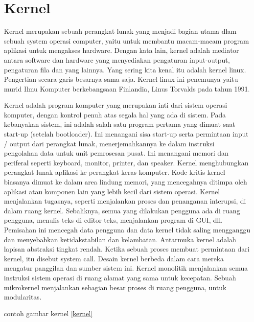 
	
	\section{Kernel}
Kernel merupakan sebuah perangkat lunak yang menjadi bagian utama dlam sebuah system operasi computer, yaitu untuk membantu macam-macam program aplikasi untuk mengakses hardware. 
Dengan kata lain, kernel adalah mediator antara software dan hardware yang menyediakan pengaturan input-output, pengaturan fila dan yang lainnya. 
Yang sering kita kenal itu adalah kernel linux. Pengertian secara garis besarnya sama saja. Kernel linux ini penemunya yaitu  murid Ilmu Komputer berkebangsaan Finlandia, Linus Torvalds pada tahun 1991.

	 Kernel adalah program komputer yang merupakan inti dari sistem operasi komputer, dengan kontrol penuh atas segala hal yang ada di sistem. Pada kebanyakan sistem, ini adalah salah satu program pertama yang dimuat
	 saat start-up (setelah bootloader). 
	 Ini menangani sisa start-up serta permintaan input / output dari perangkat lunak, menerjemahkannya ke dalam instruksi pengolahan data untuk unit pemrosesan pusat. Ini menangani memori dan periferal seperti keyboard, 
	 monitor, printer, dan speaker.
	 Kernel menghubungkan perangkat lunak aplikasi ke perangkat keras komputer.
	 Kode kritis kernel biasanya dimuat ke dalam area lindung memori, yang mencegahnya ditimpa oleh aplikasi atau komponen lain yang lebih kecil dari sistem operasi. Kernel menjalankan tugasnya, seperti menjalankan proses 
	 dan penanganan interupsi, di dalam ruang kernel. 
	 Sebaliknya, semua yang dilakukan pengguna ada di ruang pengguna, menulis teks di editor teks, menjalankan program di GUI, dll. Pemisahan ini mencegah data pengguna dan data kernel tidak saling mengganggu dan menyebabkan 
	 ketidakstabilan dan kelambatan. 
	 Antarmuka kernel adalah lapisan abstraksi tingkat rendah. Ketika sebuah proses membuat permintaan dari kernel, itu disebut system call. Desain kernel berbeda dalam cara mereka mengatur panggilan dan sumber sistem ini. 
	 Kernel monolitik menjalankan semua instruksi sistem operasi di ruang alamat yang sama untuk kecepatan. Sebuah mikrokernel menjalankan sebagian besar proses di ruang pengguna, untuk modularitas. 
	
	contoh gambar kernel \ref{kernel}

